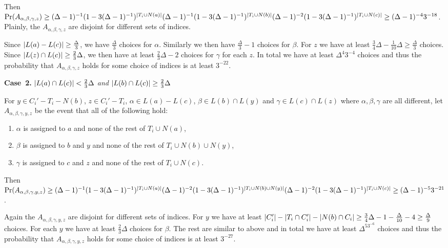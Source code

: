 Then $\Pr(A_{\alpha, \beta, \gamma, z}) \geq (\Delta-1)^{-1}(1-
3(\Delta-1)^{-1})^{\left|T_i \cup N(a)\right|}(\Delta-1)^{-1}(1-
3(\Delta-1)^{-1})^{\left|T_i \cup N(b)\right|}(\Delta-1)^{-2}(1-
3(\Delta-1)^{-1})^{\left|T_i \cup N(c)\right|} \geq (\Delta-1)^{-4}3^{-18}$. Plainly, the $A_{\alpha, \beta, \gamma, z}$ are disjoint for different sets of
indices.  

Since $\left|L(a) - L(c)\right| \geq \frac{\Delta}{3}$, we have
$\frac{\Delta}{3}$ choices for $\alpha$.  Similarly we then have
$\frac{\Delta}{3} - 1$ choices for $\beta$.  For $z$ we have at least $\frac34
\Delta - \frac{1}{10}\Delta \geq \frac{\Delta}{3}$ choices.  Since $\left|L(z)
\cap L(c)\right| \geq \frac23 \Delta$, we then have at least $\frac23\Delta - 2$
choices for $\gamma$ for each $z$.  In total we have at least $\Delta^4 3^{-4}$
choices and thus the probability that $A_{\alpha, \beta, \gamma, z}$ holds for
some choice of indices is at least $3^{-22}$.

\textbf{Case~2.} \textit{$\left|L(a) \cap L(c)\right| < \frac23 \Delta$ and $\left|L(b) \cap
L(c)\right| \geq \frac23 \Delta$}

For $y \in C_i' - T_i - N(b)$, $z \in C_i' - T_i$, $\alpha \in L(a) - L(c)$,
$\beta \in L(b) \cap L(y)$ and $\gamma \in L(c) \cap L(z)$ where $\alpha, \beta,
\gamma$ are all different, let $A_{\alpha, \beta, \gamma, y, z}$ be the event
that all of the following hold:

\begin{enumerate}
  \item $\alpha$ is assigned to $a$ and none of the rest of $T_i \cup N(a)$,
  \item $\beta$ is assigned to $b$ and $y$ and none of the rest of $T_i \cup
  N(b) \cup N(y)$,
  \item $\gamma$ is assigned to $c$ and $z$ and none of the rest of $T_i \cup N(c)$.
\end{enumerate}

Then $\Pr(A_{\alpha, \beta, \gamma, y, z}) \geq (\Delta-1)^{-1}(1-
3(\Delta-1)^{-1})^{\left|T_i \cup N(a)\right|}(\Delta-1)^{-2}(1-
3(\Delta-1)^{-1})^{\left|T_i \cup N(b) \cup N(y)\right|}(\Delta-1)^{-2}(1-
3(\Delta-1)^{-1})^{\left|T_i \cup N(c)\right|} \geq (\Delta-1)^{-5}3^{-21}$.

Again the $A_{\alpha, \beta, \gamma, y, z}$ are disjoint for different sets of
indices.  For $y$ we have at least $\left|C_i'\right| - \left|T_i \cap C_i'\right| -
\left|N(b) \cap C_i\right| \geq \frac34 \Delta - 1 - \frac{\Delta}{10} - 4 \geq
\frac{\Delta}{9}$ choices.  For each $y$ we have at least $\frac23 \Delta$ choices for $\beta$. 
The rest are similar to above and in total we have at least $\Delta^53^{-6}$
choices and thus the probability that $A_{\alpha, \beta, \gamma, y, z}$ holds
for some choice of indices is at least $3^{-27}$.

